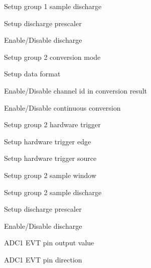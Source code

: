 \begin{DoxyItemize}
\item Setup group 1 sample discharge
\begin{DoxyItemize}
\item Setup discharge prescaler
\item Enable/\+Disable discharge
\end{DoxyItemize}
\item Setup group 2 conversion mode
\begin{DoxyItemize}
\item Setup data format
\item Enable/\+Disable channel id in conversion result
\item Enable/\+Disable continuous conversion
\end{DoxyItemize}
\item Setup group 2 hardware trigger
\begin{DoxyItemize}
\item Setup hardware trigger edge
\item Setup hardware trigger source
\end{DoxyItemize}
\item Setup group 2 sample window ~\newline
~\newline
~\newline
~\newline
~\newline
~\newline
~\newline
~\newline
~\newline

\item Setup group 2 sample discharge
\begin{DoxyItemize}
\item Setup discharge prescaler
\item Enable/\+Disable discharge
\end{DoxyItemize}
\item A\+D\+C1 E\+VT pin output value ~\newline
~\newline
~\newline
~\newline
~\newline
~\newline
~\newline

\item A\+D\+C1 E\+VT pin direction ~\newline
~\newline
~\newline
~\newline
~\newline
~\newline


\end{DoxyItemize}
